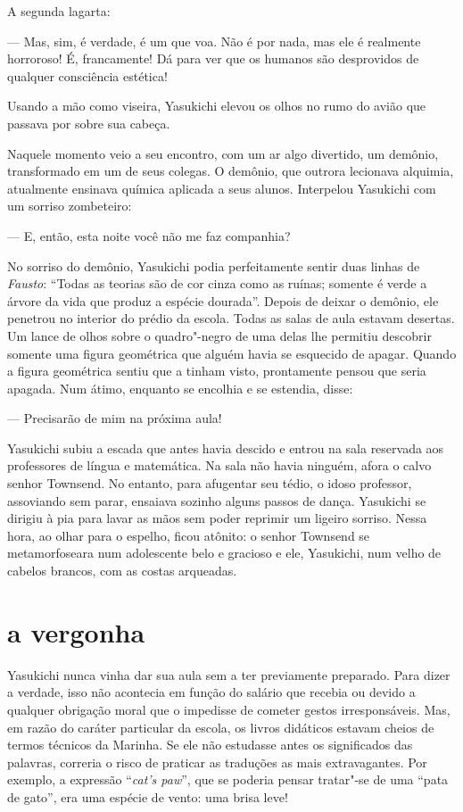 A segunda lagarta:

--- Mas, sim, é verdade, é um que voa. Não é por nada, mas ele é realmente
horroroso! É, francamente! Dá para ver que os humanos são desprovidos
de qualquer consciência estética!

Usando a mão como viseira, Yasukichi elevou os olhos no rumo do avião
que passava por sobre sua cabeça.

Naquele momento veio a seu encontro, com um ar algo divertido, um
demônio, transformado em um de seus colegas. O demônio, que outrora
lecionava alquimia, atualmente ensinava química aplicada a seus alunos.
Interpelou Yasukichi com um sorriso zombeteiro:

--- E, então, esta noite você não me faz companhia?

No sorriso do demônio, Yasukichi podia perfeitamente sentir duas linhas
de \textit{Fausto}: ``Todas as teorias são de cor cinza como as ruínas;
somente é verde a árvore da vida que produz a espécie dourada''. Depois
de deixar o demônio, ele penetrou no interior do prédio da escola.
Todas as salas de aula estavam desertas. Um lance de olhos sobre o
quadro"-negro de uma delas lhe permitiu descobrir somente uma figura
geométrica que alguém havia se esquecido de apagar. Quando a figura
geométrica sentiu que a tinham visto, prontamente pensou que seria
apagada. Num átimo, enquanto se encolhia e se estendia, disse:

--- Precisarão de mim na próxima aula!

Yasukichi subiu a escada que antes havia descido e entrou na sala
reservada aos professores de língua e matemática. Na sala não havia
ninguém, afora o calvo senhor Townsend. No entanto, para afugentar seu
tédio, o idoso professor, assoviando sem parar, ensaiava sozinho alguns
passos de dança. Yasukichi se dirigiu à pia para lavar as mãos sem
poder reprimir um ligeiro sorriso. Nessa hora, ao olhar para o espelho,
ficou atônito: o senhor Townsend se metamorfoseara num adolescente belo
e gracioso e ele, Yasukichi, num velho de cabelos brancos, com as
costas arqueadas.\ \\

\section*{a vergonha}

Yasukichi nunca vinha dar sua aula sem a ter previamente preparado. Para
dizer a verdade, isso não acontecia em função do salário que recebia ou
devido a qualquer obrigação moral que o impedisse de cometer gestos
irresponsáveis. Mas, em razão do caráter particular da escola, os
livros didáticos estavam cheios de termos técnicos da Marinha. Se ele
não estudasse antes os significados das palavras, correria o risco de
praticar as traduções as mais extravagantes. Por exemplo, a expressão
``\textit{cat's paw}'', que se poderia pensar tratar"-se de uma ``pata de
gato'', era uma espécie de vento: uma brisa leve!

